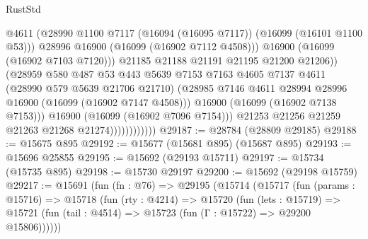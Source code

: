 \begin{lexlean}{RustStd}
\begin{coremodule}
                                      @4611
                                      (@28990
                                        @1100
                                        @7117
                                        (@16094 (@16095 @7117))
                                        (@16099 (@16101 @1100 @53)))
                                      @28996
                                      @16900
                                      (@16099 (@16902 @7112 @4508)))
                                    @16900
                                    (@16099 (@16902 @7103 @7120)))
                                  @21185
                                  @21188
                                  @21191
                                  @21195
                                  @21200
                                  @21206))
                              (@28959
                                @580
                                @487
                                @53
                                @443
                                @5639
                                @7153
                                @7163
                                @4605
                                @7137
                                @4611
                                (@28990 @579 @5639 @21706 @21710)
                                (@28985
                                  @7146
                                  @4611
                                  @28994
                                  @28996
                                  @16900
                                  (@16099 (@16902 @7147 @4508)))
                                @16900
                                (@16099 (@16902 @7138 @7153)))
                              @16900
                              (@16099 (@16902 @7096 @7154)))
                            @21253
                            @21256
                            @21259
                            @21263
                            @21268
                            @21274))))))))))))
@29187 := @28784 (@28809 @29185)
@29188 := @15675 @895
@29192 := @15677 (@15681 @895) (@15687 @895)
@29193 := @15696 @25855
@29195 := @15692 (@29193 @15711)
@29197 := @15734 (@15735 @895)
@29198 := @15730 @29197
@29200 := @15692 (@29198 @15759)
@29217 := @15691
    (fun (fn : @76) =>
    @29195
      (@15714
        (@15717
          (fun (params : @15716) =>
          @15718
            (fun (rty : @4214) =>
            @15720
              (fun (lets : @15719) =>
              @15721 (fun (tail : @4514) => @15723 (fun (Γ : @15722) => @29200 @15806))))))

\end{coremodule}
\end{lexlean}

